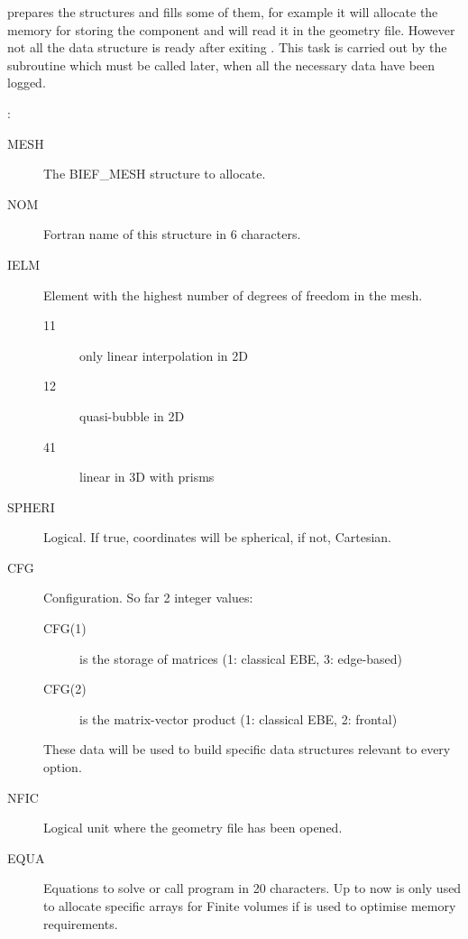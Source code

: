  prepares the  structures and fills some of
them, for example it will allocate the memory for storing the component
 and will read it in the geometry file. However not all the data
structure is ready after exiting . This task is carried out by
the subroutine  which must be called later, when all the
necessary data have been logged.

:
\begin{description}
\item [MESH] The BIEF\_MESH structure to allocate.
\item [NOM] Fortran name of this structure in 6 characters.
\item [IELM] Element with the highest number of degrees of freedom in the mesh.
  \begin{description}
  \item [11] only linear interpolation in 2D
  \item [12] quasi-bubble in 2D
  \item [41] linear in 3D with prisms
  \end{description}
\item [SPHERI] Logical. If true, coordinates will be spherical, if not, Cartesian.
\item [CFG] Configuration. So far 2 integer values:
  \begin{description}
    \item [CFG(1)] is the storage of matrices (1: classical EBE, 3: edge-based)
    \item [CFG(2)] is the matrix-vector product (1: classical EBE, 2: frontal)
  \end{description}
   These data will be used to build specific data structures relevant to
   every option.
\item [NFIC] Logical unit where the geometry file has been opened.
\item [EQUA] Equations to solve or call program in 20 characters. Up to
  now is only used to allocate specific arrays for Finite volumes if
   is used to optimise memory requirements.
\end{description}

